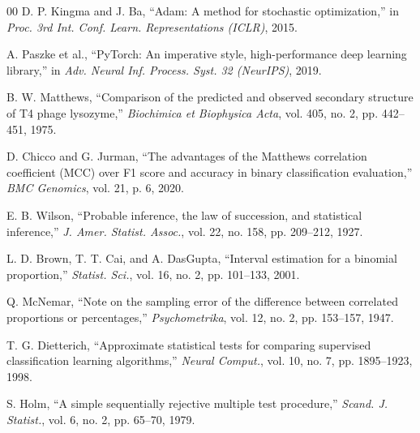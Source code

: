 \begin{thebibliography}{00}
D. P. Kingma and J. Ba, ``Adam: A method for stochastic optimization,'' in \emph{Proc. 3rd Int. Conf. Learn. Representations (ICLR)}, 2015.

A. Paszke et al., ``PyTorch: An imperative style, high-performance deep learning library,'' in \emph{Adv. Neural Inf. Process. Syst. 32 (NeurIPS)}, 2019.

B. W. Matthews, ``Comparison of the predicted and observed secondary structure of T4 phage lysozyme,'' \emph{Biochimica et Biophysica Acta}, vol. 405, no. 2, pp. 442--451, 1975.

D. Chicco and G. Jurman, ``The advantages of the Matthews correlation coefficient (MCC) over F1 score and accuracy in binary classification evaluation,'' \emph{BMC Genomics}, vol. 21, p. 6, 2020.

E. B. Wilson, ``Probable inference, the law of succession, and statistical inference,'' \emph{J. Amer. Statist. Assoc.}, vol. 22, no. 158, pp. 209--212, 1927.

L. D. Brown, T. T. Cai, and A. DasGupta, ``Interval estimation for a binomial proportion,'' \emph{Statist. Sci.}, vol. 16, no. 2, pp. 101--133, 2001.

Q. McNemar, ``Note on the sampling error of the difference between correlated proportions or percentages,'' \emph{Psychometrika}, vol. 12, no. 2, pp. 153--157, 1947.

T. G. Dietterich, ``Approximate statistical tests for comparing supervised classification learning algorithms,'' \emph{Neural Comput.}, vol. 10, no. 7, pp. 1895--1923, 1998.

S. Holm, ``A simple sequentially rejective multiple test procedure,'' \emph{Scand. J. Statist.}, vol. 6, no. 2, pp. 65--70, 1979.

\end{thebibliography}
